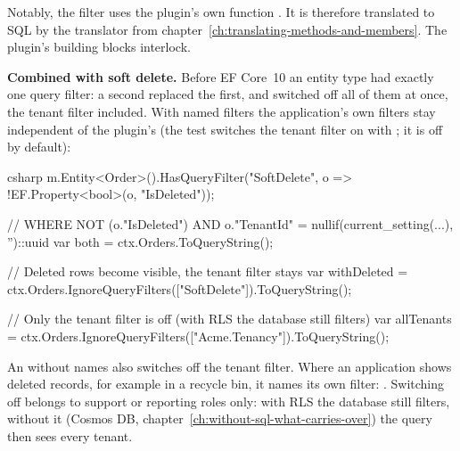 Notably, the filter uses the plugin's own function
. It
is therefore translated to SQL by the translator from
chapter~\ref{ch:translating-methods-and-members}. The plugin's building blocks interlock.

\textbf{Combined with soft delete.} Before EF Core~10 an entity type had exactly one query
filter: a second  replaced the first, and
 switched off all of them at
once, the tenant filter included. With named filters the application's own filters stay
independent of the plugin's (the test switches the tenant filter on with
; it is off by default):

\begin{sourcecode}{csharp}
m.Entity<Order>().HasQueryFilter("SoftDelete", o => !EF.Property<bool>(o, "IsDeleted"));

// WHERE NOT (o."IsDeleted") AND o."TenantId" = nullif(current_setting(...), '')::uuid
var both = ctx.Orders.ToQueryString();

// Deleted rows become visible, the tenant filter stays
var withDeleted = ctx.Orders.IgnoreQueryFilters(["SoftDelete"]).ToQueryString();

// Only the tenant filter is off (with RLS the database still filters)
var allTenants = ctx.Orders.IgnoreQueryFilters(["Acme.Tenancy"]).ToQueryString();
\end{sourcecode}

\begin{important}
  An  without names also
  switches off the tenant filter. Where an application shows deleted records, for example in a
  recycle bin, it names its own filter:
  .
  Switching off  belongs to support or reporting roles only:
  with RLS the database still filters, without it (Cosmos DB,
  chapter~\ref{ch:without-sql-what-carries-over}) the query then sees every tenant.
\end{important}

